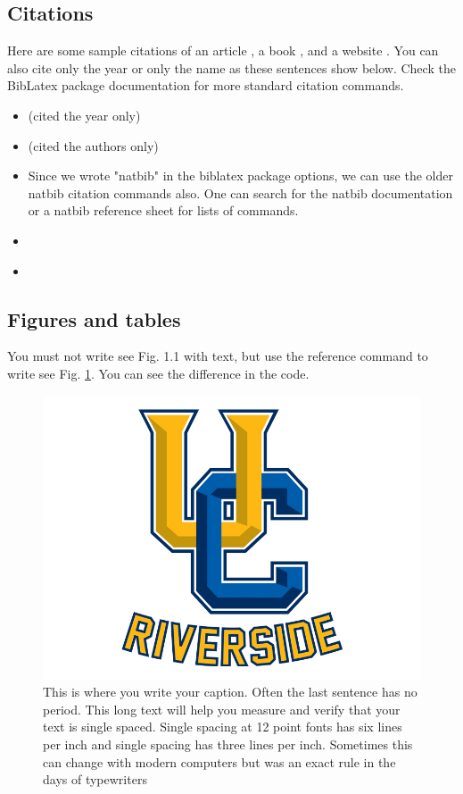 \subsection{Citations}

Here are some sample citations of an article \parencite{ezcurra2016coastal}, a book \parencite{felger1985people}, and a website \parencite{pew2015internettime}. You can also cite only the year or only the name as these sentences show below. Check the BibLatex package documentation for more standard citation commands.
\begin{itemize}
    \item \citeyear{ezcurra2016coastal} (cited the year only)
    \item \citeauthor{felger1985people} (cited the authors only)
    \item Since we wrote "natbib" in the biblatex package options, we can use the older natbib citation commands also. One can search for the natbib documentation or a natbib reference sheet for lists of commands.
    \item \citet{ezcurra2016coastal}
    \item \citealp{felger1985people}
\end{itemize}

\subsection{Figures and tables}

You must not write see Fig. 1.1 with text, but use the reference command to write see Fig. \ref{fig:1.1}. You can see the difference in the code.
\begin{figure}[H] %
\centering
\includegraphics[scale = 0.3] {images/ucr}
\caption{This is where you write your caption. Often the last sentence has no period. This long text will help you measure and verify that your text is single spaced. Single spacing at 12 point fonts has six lines per inch and single spacing has three lines per inch. Sometimes this can change with modern computers but was an exact rule in the days of typewriters} 
\label{fig:1.1}
\end{figure}


